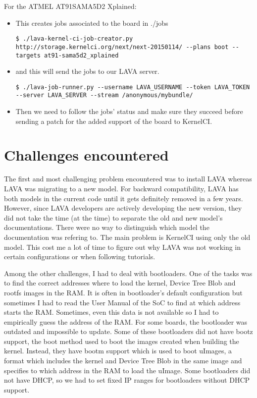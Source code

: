 For the ATMEL AT91SAMA5D2 Xplained:
\begin{itemize}
  \item This creates jobs associated to the board in ./jobs

\begin{verbatim}
$ ./lava-kernel-ci-job-creator.py http://storage.kernelci.org/next/next-20150114/ --plans boot --targets at91-sama5d2_xplained
\end{verbatim}

  \item and this will send the jobs to our LAVA server.

\begin{verbatim}
$ ./lava-job-runner.py --username LAVA_USERNAME --token LAVA_TOKEN --server LAVA_SERVER --stream /anonymous/mybundle/
\end{verbatim}

  \item Then we need to follow the jobs' status and make sure they succeed before sending a patch for the added support of the board to KernelCI.
\end{itemize}

\section{Challenges encountered}
The first and most challenging problem encountered was to install LAVA whereas LAVA was migrating to a new model. For backward compatibility, LAVA has both models in the current code until it gets definitely removed in a few years. However, since LAVA developers are actively developing the new version, they did not take the time (at the time) to separate the old and new model's documentations. There were no way to distinguish which model the documentation was refering to. The main problem is KernelCI using only the old model. This cost me a lot of time to figure out why LAVA was not working in certain configurations or when following tutorials.

Among the other challenges, I had to deal with bootloaders. One of the tasks was to find the correct addresses where to load the kernel, Device Tree Blob and rootfs images in the RAM. It is often in bootloader's default configuration but sometimes I had to read the User Manual of the SoC to find at which address starts the RAM. Sometimes, even this data is not available so I had to empirically guess the address of the RAM. For some boards, the bootloader was outdated and impossible to update. Some of these bootloaders did not have bootz support, the boot method used to boot the images created when building the kernel. Instead, they have bootm support which is used to boot uImages, a format which includes the kernel and Device Tree Blob in the same image and specifies to which address in the RAM to load the uImage. Some bootloaders did not have DHCP, so we had to set fixed IP ranges for bootloaders without DHCP support.

